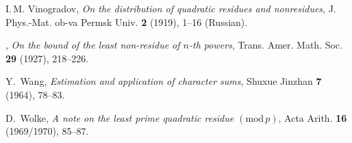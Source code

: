 \documentclass{scrartcl}
\theoremstyle{plain}
\theoremstyle{remark}
\newcommand{\1}{\mathbf{1}}
\begin{document}
{\begin{thebibliography}{10}
{I.\,M.} Vinogradov, \emph{On the distribution of quadratic residues and
  nonresidues}, J. Phys.-Mat. ob-va Permsk Univ. \textbf{2} (1919), 1--16
  (Russian).

\bysame, \emph{On the bound of the least non-residue of $n$-th powers}, Trans.
  Amer. Math. Soc. \textbf{29} (1927), 218--226.

Y.~Wang, \emph{Estimation and application of character sums}, Shuxue Jinzhan
  \textbf{7} (1964), 78--83.

D.~Wolke, \emph{A note on the least prime quadratic residue {$({\mathrm
  {mod}}\,p)$}}, Acta Arith. \textbf{16} (1969/1970), 85--87.

\end{thebibliography}

}
\end{document}
